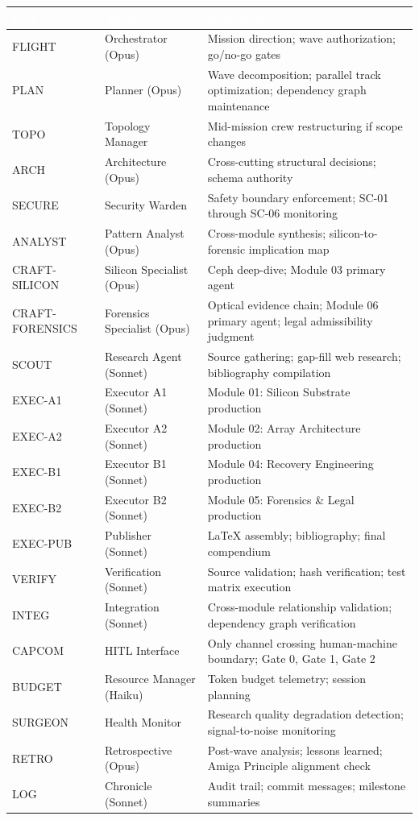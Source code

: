 \documentclass[11pt,letterpaper]{article}
\newcommand{\tableheader}[1]{\textbf{\sffamily\textcolor{white}{#1}}}
\begin{document}
\begin{center}
\begin{tabularx}{\textwidth}{L{2cm}L{3cm}X}
\toprule
{}
\tableheader{Role} & \tableheader{Agent} & \tableheader{Responsibility} \\
\midrule
FLIGHT & Orchestrator (Opus) & Mission direction; wave authorization; go/no-go gates \\
PLAN & Planner (Opus) & Wave decomposition; parallel track optimization; dependency graph maintenance \\
TOPO & Topology Manager & Mid-mission crew restructuring if scope changes \\
ARCH & Architecture (Opus) & Cross-cutting structural decisions; schema authority \\
SECURE & Security Warden & Safety boundary enforcement; SC-01 through SC-06 monitoring \\
ANALYST & Pattern Analyst (Opus) & Cross-module synthesis; silicon-to-forensic implication map \\
CRAFT-SILICON & Silicon Specialist (Opus) & Ceph deep-dive; Module 03 primary agent \\
CRAFT-FORENSICS & Forensics Specialist (Opus) & Optical evidence chain; Module 06 primary agent; legal admissibility judgment \\
SCOUT & Research Agent (Sonnet) & Source gathering; gap-fill web research; bibliography compilation \\
EXEC-A1 & Executor A1 (Sonnet) & Module 01: Silicon Substrate production \\
EXEC-A2 & Executor A2 (Sonnet) & Module 02: Array Architecture production \\
EXEC-B1 & Executor B1 (Sonnet) & Module 04: Recovery Engineering production \\
EXEC-B2 & Executor B2 (Sonnet) & Module 05: Forensics \& Legal production \\
EXEC-PUB & Publisher (Sonnet) & LaTeX assembly; bibliography; final compendium \\
VERIFY & Verification (Sonnet) & Source validation; hash verification; test matrix execution \\
INTEG & Integration (Sonnet) & Cross-module relationship validation; dependency graph verification \\
CAPCOM & HITL Interface & Only channel crossing human-machine boundary; Gate 0, Gate 1, Gate 2 \\
BUDGET & Resource Manager (Haiku) & Token budget telemetry; session planning \\
SURGEON & Health Monitor & Research quality degradation detection; signal-to-noise monitoring \\
RETRO & Retrospective (Opus) & Post-wave analysis; lessons learned; Amiga Principle alignment check \\
LOG & Chronicle (Sonnet) & Audit trail; commit messages; milestone summaries \\
\bottomrule
\end{tabularx}
\end{center}
\end{document}
